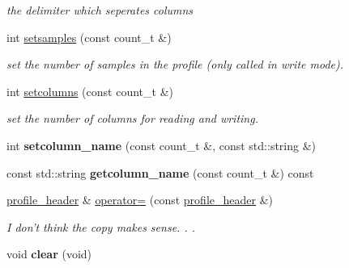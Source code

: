 \begin{DoxyCompactItemize}
\begin{DoxyCompactList}\small\item\em the delimiter which seperates columns \end{DoxyCompactList}\item 
\hypertarget{classprofile__header_aa0316b529c96f14c240807cb1b9027c3}{int \hyperlink{classprofile__header_aa0316b529c96f14c240807cb1b9027c3}{setsamples} (const count\-\_\-t \&)}\label{classprofile__header_aa0316b529c96f14c240807cb1b9027c3}

\begin{DoxyCompactList}\small\item\em set the number of samples in the profile (only called in write mode). \end{DoxyCompactList}\item 
\hypertarget{classprofile__header_a9e83afd1b3c7be15b90b49b7849b6768}{int \hyperlink{classprofile__header_a9e83afd1b3c7be15b90b49b7849b6768}{setcolumns} (const count\-\_\-t \&)}\label{classprofile__header_a9e83afd1b3c7be15b90b49b7849b6768}

\begin{DoxyCompactList}\small\item\em set the number of columns for reading and writing. \end{DoxyCompactList}\item 
\hypertarget{classprofile__header_a7cadad0c1745947fb34071ca2ef1bdcd}{int {\bfseries setcolumn\-\_\-name} (const count\-\_\-t \&, const std\-::string \&)}\label{classprofile__header_a7cadad0c1745947fb34071ca2ef1bdcd}

\item 
\hypertarget{classprofile__header_a3ea72f2fd9bdcde0a4a5d1f1e7335e64}{const std\-::string {\bfseries getcolumn\-\_\-name} (const count\-\_\-t \&) const }\label{classprofile__header_a3ea72f2fd9bdcde0a4a5d1f1e7335e64}

\item 
\hypertarget{classprofile__header_a05787a0e90bb4f27d6b7b1cccecd20d3}{\hyperlink{classprofile__header}{profile\-\_\-header} \& \hyperlink{classprofile__header_a05787a0e90bb4f27d6b7b1cccecd20d3}{operator=} (const \hyperlink{classprofile__header}{profile\-\_\-header} \&)}\label{classprofile__header_a05787a0e90bb4f27d6b7b1cccecd20d3}

\begin{DoxyCompactList}\small\item\em I don't think the copy makes sense. . . \end{DoxyCompactList}\item 
\hypertarget{classprofile__header_a0d5f93dc2568aa4abc87f823627d4a8f}{void {\bfseries clear} (void)}\label{classprofile__header_a0d5f93dc2568aa4abc87f823627d4a8f}

\end{DoxyCompactItemize}
